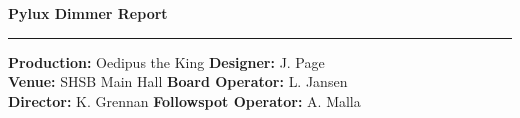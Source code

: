 \documentclass{genlux}
\begin{document}
\hfil{\Huge\bf Pylux Dimmer Report}\hfill 
\bigskip\break 
\hrule 

{\bf Production: } Oedipus the King \hfill {\bf Designer: } J. Page \\
{\bf Venue: } SHSB Main Hall \hfill {\bf Board Operator: } L. Jansen \\
{\bf Director: } K. Grennan \hfill {\bf Followspot Operator: } A. Malla \\

\begin{reportTable}



\subtotal



\subtotal  

\end{reportTable}
\end{document}
